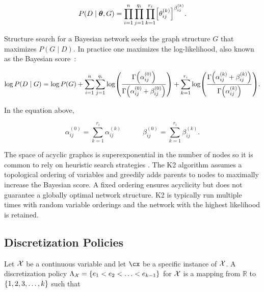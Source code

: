 \begin{equation}
P(D\mid \bm{\theta}, G) = \prod_{i=1}^n \prod_{j=1}^{q_i} \prod_{k=1}^{r_i} \brock{\theta_{ij}^{(k)}}^{\beta_{ij}^{(k)}}\text{.}
\end{equation}


Structure search for a Bayesian network seeks the graph structure $G$ that maximizes ${P(G\mid D)}$.
In practice one maximizes the log-likelihood, also known as the Bayesian score~\cite{cooper1992bayesian}:

\begin{small}
\begin{equation}
\label{eq:BayesianScore}
  \log P(D\mid G) = \log P(G) + \sum_{i=1}^n \sum_{j=1}^{q_i} \log \paren{
    \frac{
      \Gamma\paren{\alpha_{ij}^{(0)}}
    }{
      \Gamma\paren{\alpha_{ij}^{(0)} + \beta_{ij}^{(0)}}
    }
  } + \sum_{k=1}^{r_i} \log \paren{
    \frac{
      \Gamma\paren{\alpha_{ij}^{(k)} + \beta_{ij}^{(k)}}
    }{
      \Gamma\paren{\alpha_{ij}^{(k)}}
    }
  }\text{.}
\end{equation}
\end{small}

In the equation above,

\begin{equation}
\alpha_{ij}^{(0)} = \sum_{k=1}^{r_i} \alpha_{ij}^{(k)} \quad \qquad \beta_{ij}^{(0)} = \sum_{k=1}^{r_i} \beta_{ij}^{(k)}\text{.}
\end{equation}

The space of acyclic graphcs is superexponential in the number of nodes so it is common to rely on heuristic search strategies \citep{PGM_2009}.
The K2 algorithm assumes a topological ordering of variables and greedily adds parents to nodes to maximally increase the Bayesian score.
A fixed ordering ensures acyclicity but does not guarantee a globally optimal network structure.
K2 is typically run multiple times with random variable orderings and the network with the highest likelihood is retained.

\subsection{Discretization Policies}
\label{subsec:disc_policy}

Let $\mathcal{X}$ be a continuous variable and let $\cx$ be a specific instance of $\mathcal{X}$.
A discretization policy $\Lambda_{\cX} = \curly{e_1 < e_2 < \ldots < e_{k-1}}$ for $\mathcal{X}$ is a mapping from $\mathbb{R}$ to $\curly{1,2,3,\ldots,k}$ such that

